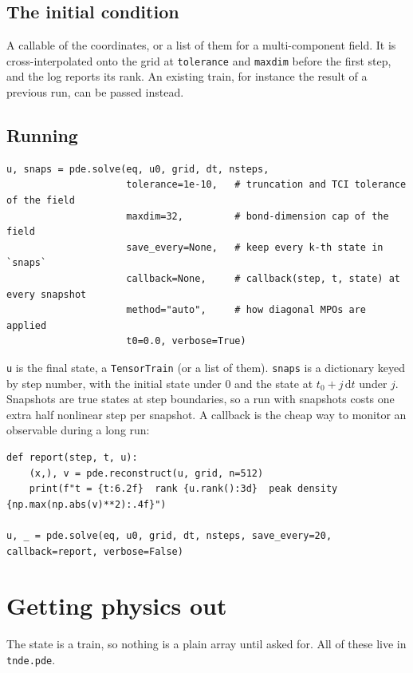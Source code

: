 \documentclass[11pt,a4paper]{article}
\newcommand{\code}[1]{\texttt{#1}}
\newcommand{\dd}{\mathrm{d}}
\begin{document}
\subsection{The initial condition}

A callable of the coordinates, or a list of them for a multi-component field. It is
cross-interpolated onto the grid at \code{tolerance} and \code{maxdim} before the first
step, and the log reports its rank. An existing train, for instance the result of a
previous run, can be passed instead.

\subsection{Running}
\begin{lstlisting}
u, snaps = pde.solve(eq, u0, grid, dt, nsteps,
                     tolerance=1e-10,   # truncation and TCI tolerance of the field
                     maxdim=32,         # bond-dimension cap of the field
                     save_every=None,   # keep every k-th state in `snaps`
                     callback=None,     # callback(step, t, state) at every snapshot
                     method="auto",     # how diagonal MPOs are applied
                     t0=0.0, verbose=True)
\end{lstlisting}
\code{u} is the final state, a \code{TensorTrain} (or a list of them). \code{snaps} is
a dictionary keyed by step number, with the initial state under 0 and the state at
$t_0+j\,\dd t$ under $j$. Snapshots are true states at step boundaries, so a run with
snapshots costs one extra half nonlinear step per snapshot. A callback is the cheap
way to monitor an observable during a long run:
\begin{lstlisting}
def report(step, t, u):
    (x,), v = pde.reconstruct(u, grid, n=512)
    print(f"t = {t:6.2f}  rank {u.rank():3d}  peak density {np.max(np.abs(v)**2):.4f}")

u, _ = pde.solve(eq, u0, grid, dt, nsteps, save_every=20, callback=report, verbose=False)
\end{lstlisting}

\section{Getting physics out}
\label{sec:out}

The state is a train, so nothing is a plain array until asked for. All of these live in
\code{tnde.pde}.
\end{document}
